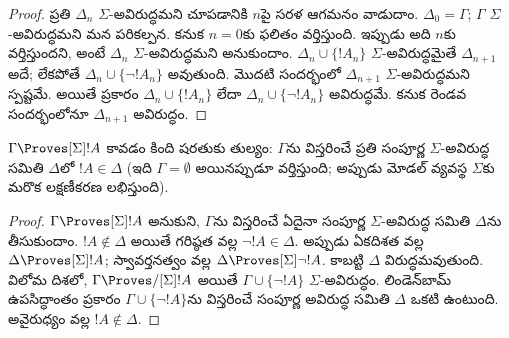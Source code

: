 \documentclass[../../../include/open-logic-section]{subfiles}
\begin{document}
\begin{proof}
ప్రతి $\Delta_n$ $\Sigma$-అవిరుద్ధమని చూపడానికి $n$పై
సరళ ఆగమనం వాడుదాం. $\Delta_0 = \Gamma$; $\Gamma$
$\Sigma$-అవిరుద్ధమని మన పరికల్పన. కనుక $n = 0$కు ఫలితం వర్తిస్తుంది.
ఇప్పుడు అది $n$కు వర్తిస్తుందని, అంటే $\Delta_n$
$\Sigma$-అవిరుద్ధమని అనుకుందాం. $\Delta_n \cup \{!A_n\}$
$\Sigma$-అవిరుద్ధమైతే $\Delta_{n+1}$ అదే; లేకపోతే
$\Delta_n \cup \{\lnot!A_n\}$ అవుతుంది. మొదటి సందర్భంలో
$\Delta_{n+1}$ $\Sigma$-అవిరుద్ధమని స్పష్టమే. అయితే
ప్రకారం $\Delta_n \cup \{!A_n\}$ లేదా $\Delta_n \cup
\{\lnot!A_n\}$ అవిరుద్ధమే. కనుక రెండవ సందర్భంలోనూ
$\Delta_{n+1}$ అవిరుద్ధం.
\end{proof}

\begin{cor}
  $\Gamma \Proves[\Sigma] !A$ కావడం కింది షరతుకు తుల్యం:
  $\Gamma$ను విస్తరించే ప్రతి సంపూర్ణ $\Sigma$-అవిరుద్ధ
  సమితి $\Delta$లో $!A \in \Delta$ (ఇది $\Gamma = \emptyset$
  అయినప్పుడూ వర్తిస్తుంది; అప్పుడు మోడల్ వ్యవస్థ $\Sigma$కు
  మరొక లక్షణీకరణ లభిస్తుంది).
\end{cor}

\begin{proof}
  $\Gamma \Proves[\Sigma] !A$ అనుకుని, $\Gamma$ను విస్తరించే
  ఏదైనా సంపూర్ణ $\Sigma$-అవిరుద్ధ సమితి $\Delta$ను తీసుకుందాం.
  $!A \notin \Delta$ అయితే గరిష్ఠత వల్ల $\lnot!A \in \Delta$.
  అప్పుడు ఏకదిశత వల్ల $\Delta \Proves[\Sigma] !A$;
  స్వావర్తనత్వం వల్ల $\Delta \Proves[\Sigma] \lnot!A$.
  కాబట్టి $\Delta$ విరుద్ధమవుతుంది. విలోమ దిశలో,
  $\Gamma \Proves/[\Sigma] !A$ అయితే $\Gamma \cup \{
  \lnot!A\}$ $\Sigma$-అవిరుద్ధం. లిండెన్‌బామ్
  ఉపసిద్ధాంతం ప్రకారం $\Gamma \cup \{ \lnot!A \}$ను
  విస్తరించే సంపూర్ణ అవిరుద్ధ సమితి $\Delta$ ఒకటి ఉంటుంది.
  అవైరుధ్యం వల్ల $!A \notin \Delta$.
\end{proof}
\end{document}
